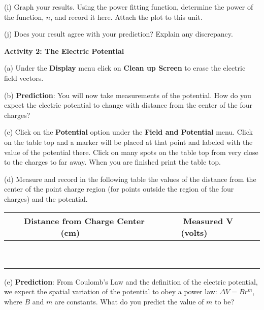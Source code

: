 (i) Graph your results. Using the power fitting
function, determine the power of the function, $n$, and record it here.
Attach the plot to this unit.
\vspace{15mm}

(j) Does your result agree with your prediction? Explain any discrepancy.\vspace{15mm}

\textbf{Activity 2: The Electric Potential}

(a) Under the {\bf Display} menu click on {\bf Clean up Screen} to erase the
electric field vectors.

(b) \textbf{Prediction}: You will now take measurements of the potential.
How do you expect the electric potential to change with distance from the center of the four charges?
\vspace{15mm}
 
(c) Click on the \textbf{Potential} option under the \textbf{Field and Potential} menu. Click on the table top and a marker will be
placed at that point and labeled with the value of the potential there.
Click on many spots on the table top from very close to the charges to
far away.
When you are finished print the table top.
\vspace{15mm}

(d) Measure and record in the following table the values of the distance from the center of the point charge region (for points outside the region of the four charges) and the potential.

\vspace{0.3cm}
{\centering \begin{tabular}{|c|c|c|}
\hline 
~~~Distance from Charge Center (cm)~~~&
~~~Measured V (volts)~~~\\
\hline
\hline 
&
\\
\hline 
&
\\
\hline 
&
\\
\hline 
&
\\
\hline 
&
\\
\hline 
&
\\
\hline 
&
\\
\hline 
&
\\
\hline 
&
\\
\hline
\end{tabular}\par}
\vspace{0.3cm}


(e) \textbf{Prediction}: From Coulomb's Law and the definition of the
electric potential, we expect the spatial variation of the potential
to obey a power law: \( \Delta V=Br^{m} \), where \( B \)
and \( m \) are constants. What do you predict the value of \textbf{\( m \)}
to be?\vspace{20mm}


